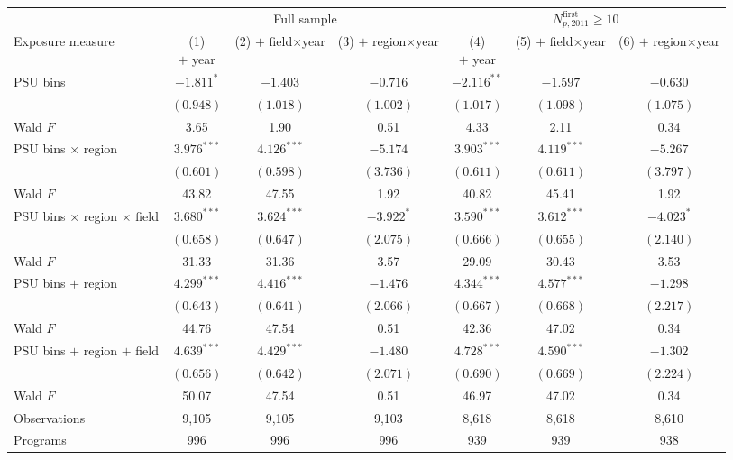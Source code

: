 \begin{tabular}{lcccccc}
\toprule
& \multicolumn{3}{c}{Full sample} & \multicolumn{3}{c}{\(N^{\mathrm{first}}_{p,2011}\geq10\)} \\
\cmidrule(lr){2-4}\cmidrule(lr){5-7}
Exposure measure & \shortstack{(1)\\\(+\) year} & \shortstack{(2)\\\(+\) field\(\times\)year} & \shortstack{(3)\\\(+\) region\(\times\)year} & \shortstack{(4)\\\(+\) year} & \shortstack{(5)\\\(+\) field\(\times\)year} & \shortstack{(6)\\\(+\) region\(\times\)year} \\
\midrule
PSU bins & \(-1.811^{*}\) & \(-1.403\) & \(-0.716\) & \(-2.116^{**}\) & \(-1.597\) & \(-0.630\) \\
 & \((0.948)\) & \((1.018)\) & \((1.002)\) & \((1.017)\) & \((1.098)\) & \((1.075)\) \\
\quad Wald \(F\) &  3.65 &  1.90 &  0.51 &  4.33 &  2.11 &  0.34 \\
\addlinespace[0.06cm]
PSU bins \(\times\) region & \( 3.976^{***}\) & \( 4.126^{***}\) & \(-5.174\) & \( 3.903^{***}\) & \( 4.119^{***}\) & \(-5.267\) \\
 & \((0.601)\) & \((0.598)\) & \((3.736)\) & \((0.611)\) & \((0.611)\) & \((3.797)\) \\
\quad Wald \(F\) & 43.82 & 47.55 &  1.92 & 40.82 & 45.41 &  1.92 \\
\addlinespace[0.06cm]
PSU bins \(\times\) region \(\times\) field & \( 3.680^{***}\) & \( 3.624^{***}\) & \(-3.922^{*}\) & \( 3.590^{***}\) & \( 3.612^{***}\) & \(-4.023^{*}\) \\
 & \((0.658)\) & \((0.647)\) & \((2.075)\) & \((0.666)\) & \((0.655)\) & \((2.140)\) \\
\quad Wald \(F\) & 31.33 & 31.36 &  3.57 & 29.09 & 30.43 &  3.53 \\
\addlinespace[0.06cm]
PSU bins \(+\) region & \( 4.299^{***}\) & \( 4.416^{***}\) & \(-1.476\) & \( 4.344^{***}\) & \( 4.577^{***}\) & \(-1.298\) \\
 & \((0.643)\) & \((0.641)\) & \((2.066)\) & \((0.667)\) & \((0.668)\) & \((2.217)\) \\
\quad Wald \(F\) & 44.76 & 47.54 &  0.51 & 42.36 & 47.02 &  0.34 \\
\addlinespace[0.06cm]
PSU bins \(+\) region \(+\) field & \( 4.639^{***}\) & \( 4.429^{***}\) & \(-1.480\) & \( 4.728^{***}\) & \( 4.590^{***}\) & \(-1.302\) \\
 & \((0.656)\) & \((0.642)\) & \((2.071)\) & \((0.690)\) & \((0.669)\) & \((2.224)\) \\
\quad Wald \(F\) & 50.07 & 47.54 &  0.51 & 46.97 & 47.02 &  0.34 \\
\midrule
Observations &     9,105 &     9,105 &     9,103 &     8,618 &     8,618 &     8,610 \\
Programs &       996 &       996 &       996 &       939 &       939 &       938 \\
\bottomrule
\end{tabular}
